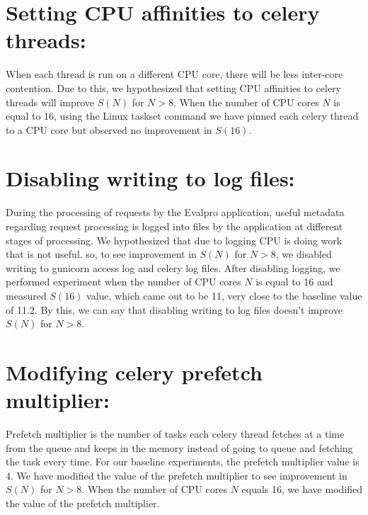 \documentclass{iitbreport}
\begin{document}
\section{Setting CPU affinities to celery threads:}
When each thread is run on a different CPU core, there will be less inter-core contention. Due to this, we hypothesized that setting CPU affinities to celery threads will improve  $S(N)$ for $N>8$. When the number of CPU cores $N$ is equal to 16, using the Linux taskset command we have pinned each celery thread to a CPU core but observed no improvement in $S(16)$.
\section{Disabling writing to log files:}
During the processing of requests by the Evalpro application, useful metadata regarding request processing is logged into files by the application at different stages of processing. We hypothesized that due to logging CPU is doing work that is not useful. so, to see improvement in $S(N)$ for $N>8$, we disabled writing to gunicorn access log and celery log files. After disabling logging, we performed experiment when the number of CPU cores $N$ is equal to 16 and measured $S(16)$ value, which came out to be 11, very close to the baseline value of 11.2. By this, we can say that disabling writing to log files doesn’t improve $S(N)$ for $N>8$.
\section{Modifying celery prefetch multiplier:}
Prefetch multiplier is the number of tasks each celery thread fetches at a time from the queue and keeps in the memory instead of going to queue and fetching the task every time. For our baseline experiments, the prefetch multiplier value is 4. We have modified the value of the prefetch multiplier to see improvement in $S(N)$ for $N>8$. When the number of CPU cores $N$  equals 16, we have modified the value of the prefetch multiplier. 
\end{document}
